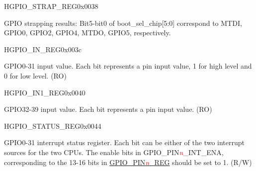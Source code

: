 \begin{register}{H}{GPIO\_STRAP\_REG}{0x0038}\label{regdesc:GPIOSTRAPREG}
%
%
\regnewline%
\begin{regdesc}\begin{reglist}
\item [GPIO\_STRAPPING]GPIO strapping results: Bit5-bit0 of boot\_sel\_chip[5:0] correspond to MTDI, GPIO0, GPIO2, GPIO4, MTDO, GPIO5, respectively.
\end{reglist}\end{regdesc}
\end{register}


\begin{register}{H}{GPIO\_IN\_REG}{0x003c}\label{regdesc:GPIOINREG}
%
\regnewline%
\begin{regdesc}\begin{reglist}
\item [GPIO\_IN\_REG]GPIO0-31 input value. Each bit represents a pin input value, 1 for high level and 0 for low level. (RO)
\end{reglist}\end{regdesc}
\end{register}


\begin{register}{H}{GPIO\_IN1\_REG}{0x0040}\label{regdesc:GPIOIN1REG}
%
%
\regnewline%
\begin{regdesc}\begin{reglist}
\item [GPIO\_IN\_DATA\_NEXT]GPIO32-39 input value. Each bit represents a pin input value. (RO)
\end{reglist}\end{regdesc}
\end{register}


\begin{register}{H}{GPIO\_STATUS\_REG}{0x0044}\label{regdesc:GPIOSTATUSREG}
%
\regnewline%
\begin{regdesc}\begin{reglist}
\item [GPIO\_STATUS\_INT]GPIO0-31 interrupt status register. Each bit can be either of the two interrupt sources for the two CPUs. The enable bits in GPIO\_PIN\textcolor{red}{\it{n}}\_INT\_ENA, corresponding to the 13-16 bits in \hyperref[regdesc:GPIOPINnREG]{GPIO\_PIN\textcolor{red}{\it{n}}\_REG} should be set to 1. (R/W)
\end{reglist}\end{regdesc}
\end{register}


